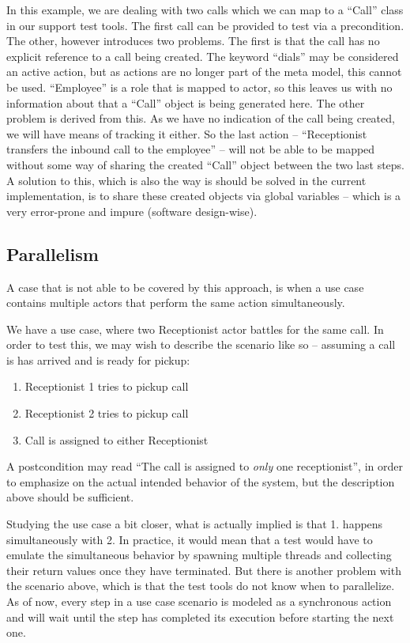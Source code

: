 In this example, we are dealing with two calls which we can map to a ``Call'' class in our support test tools. The first call can be provided to test via a precondition. The other, however introduces two problems. The first is that the call has no explicit reference to a call being created. The keyword ``dials'' may be considered an active action, but as actions are no longer part of the meta model, this cannot be used. ``Employee'' is a role that is mapped to actor, so this leaves us with no information about that a ``Call'' object is being generated here. The other problem is derived from this. As we have no indication of the call being created, we will have means of tracking it either. So the last action -- ``Receptionist transfers the inbound call to the employee'' -- will not be able to be mapped without some way of sharing the created ``Call'' object between the two last steps.\medskip
A solution to this, which is also the way is should be solved in the current implementation, is to share these created objects via global variables -- which is a very error-prone and impure (software design-wise).

\subsection{Parallelism}
\label{sec:parallelism}
A case that is not able to be covered by this approach, is when a use case contains multiple actors that perform the same action simultaneously.\medskip

\noindent We have a use case, where two Receptionist actor battles for the same call. In order to test this, we may wish to describe the scenario like so -- assuming a call is has arrived and is ready for pickup:
\begin{enumerate}
 \item Receptionist 1 tries to pickup call
 \item Receptionist 2 tries to pickup call
 \item Call is assigned to either Receptionist
\end{enumerate}
A postcondition may read ``The call is assigned to \emph{only} one receptionist'', in order to emphasize on the actual intended behavior of the system, but the description above should be sufficient.\medskip

\noindent Studying the use case a bit closer, what is actually implied is that 1. happens simultaneously with 2. In practice, it would mean that a test would have to emulate the simultaneous behavior by spawning multiple threads and collecting their return values once they have terminated. But there is another problem with the scenario above, which is that the test tools do not know when to parallelize. As of now, every step in a use case scenario is modeled as a synchronous action and will wait until the step has completed its execution before starting the next one.\medskip

